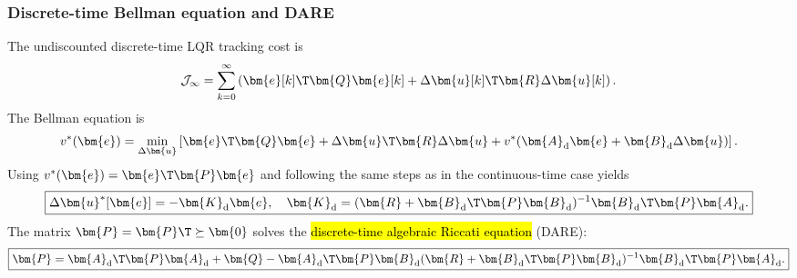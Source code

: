 \begin{frame}
	\frametitle{Discrete-time Bellman equation and DARE}
	The undiscounted discrete-time LQR tracking cost is
	\begin{equation}
		\mathcal{J}_\infty
		=\sum_{k=0}^{\infty}
		\left(\bm{e}[k]\T\bm{Q}\bm{e}[k]+\Delta\bm{u}[k]\T\bm{R}\Delta\bm{u}[k]\right).
	\end{equation}\pause%
	The Bellman equation is
	\begin{equation}
		v^*(\bm{e})=\min_{\Delta\bm{u}}
		\left[\bm{e}\T\bm{Q}\bm{e}+\Delta\bm{u}\T\bm{R}\Delta\bm{u}
			+v^*(\bm{A}_{\mathrm{d}}\bm{e}+\bm{B}_{\mathrm{d}}\Delta\bm{u})\right].
	\end{equation}\pause%
	Using $v^*(\bm{e})=\bm{e}\T\bm{P}\bm{e}$ and following the same steps as in the continuous-time case yields
	\begin{equation}
		\boxed{\Delta\bm{u}^*[\bm{e}]=-\bm{K}_{\mathrm{d}}\bm{e},
			\quad
			\bm{K}_{\mathrm{d}}=(\bm{R}+\bm{B}_{\mathrm{d}}\T\bm{P}\bm{B}_{\mathrm{d}})^{-1}
			\bm{B}_{\mathrm{d}}\T\bm{P}\bm{A}_{\mathrm{d}}.}
	\end{equation}\pause%
	The matrix $\bm{P}=\bm{P}\T\succeq\bm{0}$ solves the \hl{discrete-time algebraic Riccati equation} (DARE):
	\begin{equation}
		\boxed{\bm{P}=\bm{A}_{\mathrm{d}}\T\bm{P}\bm{A}_{\mathrm{d}}+\bm{Q}
			-\bm{A}_{\mathrm{d}}\T\bm{P}\bm{B}_{\mathrm{d}}
			(\bm{R}+\bm{B}_{\mathrm{d}}\T\bm{P}\bm{B}_{\mathrm{d}})^{-1}
			\bm{B}_{\mathrm{d}}\T\bm{P}\bm{A}_{\mathrm{d}}.}
		\label{eq:DARE}
	\end{equation}
\end{frame}

